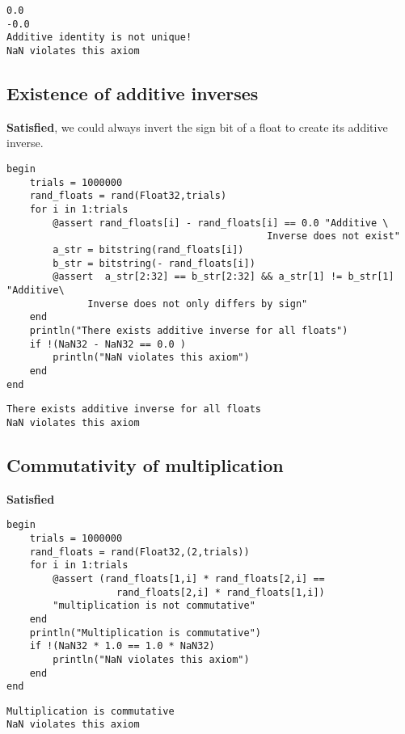 \documentclass[11pt]{article}
\begin{document}
\begin{verbatim}
0.0
-0.0
Additive identity is not unique!
NaN violates this axiom
\end{verbatim}

\subsection{Existence of additive inverses}
\label{sec:org4793e7a}
\textbf{Satisfied}, we could always invert the sign bit of a float to create its
 additive inverse.

\begin{verbatim}
begin
    trials = 1000000
    rand_floats = rand(Float32,trials)
    for i in 1:trials
        @assert rand_floats[i] - rand_floats[i] == 0.0 "Additive \
                                             Inverse does not exist"
        a_str = bitstring(rand_floats[i])
        b_str = bitstring(- rand_floats[i])
        @assert  a_str[2:32] == b_str[2:32] && a_str[1] != b_str[1] "Additive\
              Inverse does not only differs by sign"
    end
    println("There exists additive inverse for all floats")
    if !(NaN32 - NaN32 == 0.0 )
        println("NaN violates this axiom")
    end
end
\end{verbatim}

\begin{verbatim}
There exists additive inverse for all floats
NaN violates this axiom
\end{verbatim}

\subsection{Commutativity of multiplication}
\label{sec:org1492517}
\textbf{Satisfied}

\begin{verbatim}
begin
    trials = 1000000
    rand_floats = rand(Float32,(2,trials))
    for i in 1:trials
        @assert (rand_floats[1,i] * rand_floats[2,i] ==
                   rand_floats[2,i] * rand_floats[1,i])
        "multiplication is not commutative"
    end
    println("Multiplication is commutative")
    if !(NaN32 * 1.0 == 1.0 * NaN32)
        println("NaN violates this axiom")
    end
end
\end{verbatim}

\begin{verbatim}
Multiplication is commutative
NaN violates this axiom
\end{verbatim}
\end{document}
